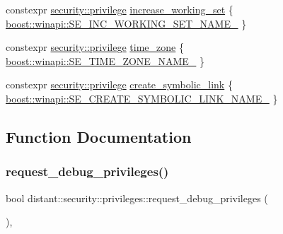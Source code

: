 \begin{DoxyCompactItemize}
\item 
constexpr \mbox{\hyperlink{classdistant_1_1security_1_1privilege}{security\+::privilege}} \mbox{\hyperlink{namespacedistant_1_1security_1_1privileges_ae41842ad8a9fc0c81119e0a016c5d4a5}{increase\+\_\+working\+\_\+set}} \{ \mbox{\hyperlink{namespaceboost_1_1winapi_aaae41a9202a5fdf5c89c50446f24afdb}{boost\+::winapi\+::\+S\+E\+\_\+\+I\+N\+C\+\_\+\+W\+O\+R\+K\+I\+N\+G\+\_\+\+S\+E\+T\+\_\+\+N\+A\+M\+E\+\_\+}} \}
\item 
constexpr \mbox{\hyperlink{classdistant_1_1security_1_1privilege}{security\+::privilege}} \mbox{\hyperlink{namespacedistant_1_1security_1_1privileges_ab1760e79a82ab6be6b9039420fdfde66}{time\+\_\+zone}} \{ \mbox{\hyperlink{namespaceboost_1_1winapi_ae247e2a627f5dcd340f927f6cfa50555}{boost\+::winapi\+::\+S\+E\+\_\+\+T\+I\+M\+E\+\_\+\+Z\+O\+N\+E\+\_\+\+N\+A\+M\+E\+\_\+}} \}
\item 
constexpr \mbox{\hyperlink{classdistant_1_1security_1_1privilege}{security\+::privilege}} \mbox{\hyperlink{namespacedistant_1_1security_1_1privileges_a5173bcc500843b4ef14cb1f31a9acf40}{create\+\_\+symbolic\+\_\+link}} \{ \mbox{\hyperlink{namespaceboost_1_1winapi_a2ae31c1d8077b060bfd5ec88aeae2fc4}{boost\+::winapi\+::\+S\+E\+\_\+\+C\+R\+E\+A\+T\+E\+\_\+\+S\+Y\+M\+B\+O\+L\+I\+C\+\_\+\+L\+I\+N\+K\+\_\+\+N\+A\+M\+E\+\_\+}} \}
\end{DoxyCompactItemize}


\subsection{Function Documentation}
\mbox{\label{namespacedistant_1_1security_1_1privileges_a116ee51fe8b7a5cd9e6c190962e1e97f}} 
\subsubsection{\texorpdfstring{request\+\_\+debug\+\_\+privileges()}{request\_debug\_privileges()}}
{\footnotesize\ttfamily bool distant\+::security\+::privileges\+::request\+\_\+debug\+\_\+privileges (\begin{DoxyParamCaption}{ }\end{DoxyParamCaption})\hspace{0.3cm}{\ttfamily [inline]}, {\ttfamily [noexcept]}}



